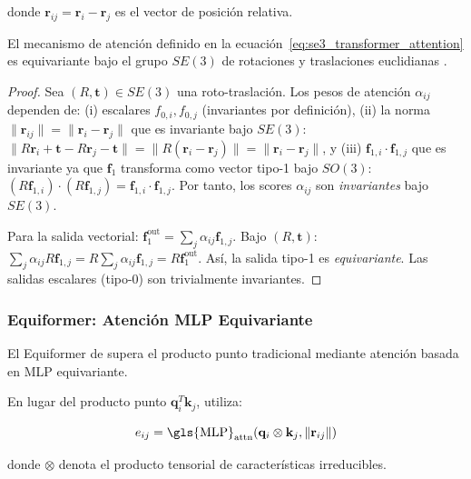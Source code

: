 donde $\mathbf{r}_{ij} = \mathbf{r}_i - \mathbf{r}_j$ es el vector de posición relativa.

\begin{theorem}
    El mecanismo de atención definido en la ecuación~\eqref{eq:se3_transformer_attention} es equivariante bajo el grupo $SE(3)$ de rotaciones y traslaciones euclidianas \citep{fuchs2020se3transformers}.
\end{theorem}

\begin{proof}
Sea $(R, \mathbf{t}) \in SE(3)$ una roto-traslación. Los pesos de atención $\alpha_{ij}$ dependen de: (i) escalares $f_{0,i}, f_{0,j}$ (invariantes por definición), (ii) la norma $\|\mathbf{r}_{ij}\| = \|\mathbf{r}_i - \mathbf{r}_j\|$ que es invariante bajo $SE(3)$: $\|R\mathbf{r}_i + \mathbf{t} - R\mathbf{r}_j - \mathbf{t}\| = \|R(\mathbf{r}_i - \mathbf{r}_j)\| = \|\mathbf{r}_i - \mathbf{r}_j\|$, y (iii) $\mathbf{f}_{1,i} \cdot \mathbf{f}_{1,j}$ que es invariante ya que $\mathbf{f}_1$ transforma como vector tipo-1 bajo $SO(3)$: $(R\mathbf{f}_{1,i}) \cdot (R\mathbf{f}_{1,j}) = \mathbf{f}_{1,i} \cdot \mathbf{f}_{1,j}$. Por tanto, los scores $\alpha_{ij}$ son \emph{invariantes} bajo $SE(3)$.

Para la salida vectorial: $\mathbf{f}_1^{\text{out}} = \sum_j \alpha_{ij} \mathbf{f}_{1,j}$. Bajo $(R, \mathbf{t})$: $\sum_j \alpha_{ij} R\mathbf{f}_{1,j} = R \sum_j \alpha_{ij} \mathbf{f}_{1,j} = R \mathbf{f}_1^{\text{out}}$. Así, la salida tipo-1 es \emph{equivariante}. Las salidas escalares (tipo-0) son trivialmente invariantes.
\end{proof}

\subsubsection{Equiformer: Atención \gls{MLP} Equivariante}

El Equiformer de \citet{liao2022equiformer} supera el producto punto tradicional mediante atención basada en \gls{MLP} equivariante.

En lugar del producto punto $\mathbf{q}_i^T \mathbf{k}_j$, utiliza:

\begin{equation}
    e_{ij} = \text{\gls{MLP}}_{\text{attn}}(\mathbf{q}_i \otimes \mathbf{k}_j, \|\mathbf{r}_{ij}\|)
    \label{eq:equiformer_attention_scores}
\end{equation}

donde $\otimes$ denota el producto tensorial de características irreducibles.

